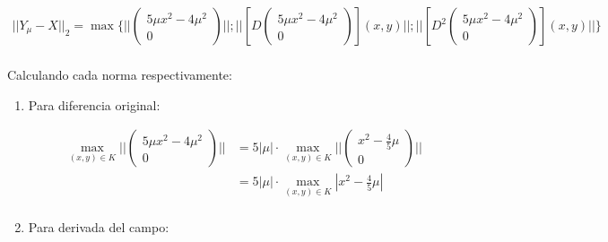 \begin{exmp}
\begin{enumerate}
		\begin{align*}
			||Y_\mu - X||_{2} = \max\bigg\{ \bigg|\bigg|\begin{pmatrix}
				5\mu x^2 - 4 \mu^2\\
				0
			\end{pmatrix}\bigg|\bigg|;
			 \bigg|\bigg|[D\begin{pmatrix}
			5\mu x^2 - 4 \mu^2\\
			0
			\end{pmatrix}](x,y) \bigg|\bigg|; \bigg|\bigg|[D^2\begin{pmatrix}
			5\mu x^2 - 4 \mu^2\\
			0
			\end{pmatrix}](x,y) \bigg|\bigg| \bigg\} \\
		\end{align*}
		
		Calculando cada norma respectivamente:
		
		\begin{enumerate}
			\item Para diferencia original:
			
			\begin{align*}
				\max_{(x,y) \in K} \bigg|\bigg|\begin{pmatrix}
					5\mu x^2 - 4 \mu^2\\
					0
				\end{pmatrix}\bigg|\bigg|  &= 5|\mu|\cdot\max_{(x,y) \in K} \bigg|\bigg|\begin{pmatrix}
				 x^2 - \frac{4}{5} \mu\\
				0
				\end{pmatrix}\bigg|\bigg|\\
				&= 5|\mu|\cdot\max_{(x,y) \in K} |
				x^2 - \frac{4}{5} \mu|\\
			\end{align*}
			
			\item Para derivada del campo:
			

\end{enumerate}
\end{enumerate}
\end{exmp}
